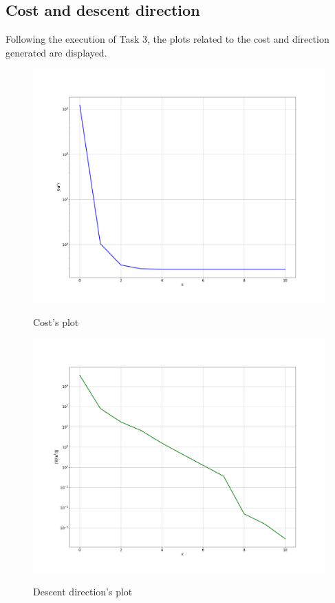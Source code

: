 \documentclass[a4paper,11pt,oneside]{book}
\begin{document}
\subsection{Cost and descent direction}
Following the execution of Task 3, the plots related to the cost and direction generated are displayed.
\begin{figure}[h]
    \centering
    \includegraphics[scale=.2]{figs/Task2/cost} \\
    \caption{Cost's plot}
    \label{fig:enter-label}
\end{figure}

\begin{figure}[h]
    \centering
    \includegraphics[scale=.2]{figs/Task2/descent_direction} \\
    \caption{Descent direction's plot}
    \label{fig:enter-label}
\end{figure}
\newpage
\end{document}
